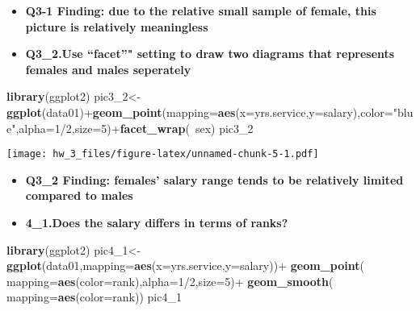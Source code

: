 \documentclass[]{article}
\newenvironment{Shaded}{\begin{snugshade}}{\end{snugshade}}
\newcommand{\KeywordTok}[1]{\textcolor[rgb]{0.13,0.29,0.53}{\textbf{{#1}}}}
\newcommand{\DataTypeTok}[1]{\textcolor[rgb]{0.13,0.29,0.53}{{#1}}}
\newcommand{\DecValTok}[1]{\textcolor[rgb]{0.00,0.00,0.81}{{#1}}}
\newcommand{\StringTok}[1]{\textcolor[rgb]{0.31,0.60,0.02}{{#1}}}
\newcommand{\NormalTok}[1]{{#1}}
\begin{document}
\begin{itemize}
\item
  \textbf{Q3-1 Finding: due to the relative small sample of female, this
  picture is relatively meaningless}
\item
  \textbf{Q3\_2.Use ``facet''" setting to draw two diagrams that
  represents females and males seperately}
\end{itemize}

\begin{Shaded}
\begin{Highlighting}[]
\KeywordTok{library}\NormalTok{(ggplot2)}
\NormalTok{pic3_2<-}\KeywordTok{ggplot}\NormalTok{(data01)+}\KeywordTok{geom_point}\NormalTok{(}\DataTypeTok{mapping=}\KeywordTok{aes}\NormalTok{(}\DataTypeTok{x=}\NormalTok{yrs.service,}\DataTypeTok{y=}\NormalTok{salary),}\DataTypeTok{color=}\StringTok{"blue"}\NormalTok{,}\DataTypeTok{alpha=}\DecValTok{1}\NormalTok{/}\DecValTok{2}\NormalTok{,}\DataTypeTok{size=}\DecValTok{5}\NormalTok{)+}\KeywordTok{facet_wrap}\NormalTok{(~sex)}
\NormalTok{pic3_2}
\end{Highlighting}
\end{Shaded}

\texttt{[image: hw\_3\_files/figure-latex/unnamed-chunk-5-1.pdf]}

\begin{itemize}
\item
  \textbf{Q3\_2 Finding: females' salary range tends to be relatively
  limited compared to males}
\item
  \textbf{4\_1.Does the salary differs in terms of ranks?}
\end{itemize}

\begin{Shaded}
\begin{Highlighting}[]
\KeywordTok{library}\NormalTok{(ggplot2)}
\NormalTok{pic4_1<-}\KeywordTok{ggplot}\NormalTok{(data01,}\DataTypeTok{mapping=}\KeywordTok{aes}\NormalTok{(}\DataTypeTok{x=}\NormalTok{yrs.service,}\DataTypeTok{y=}\NormalTok{salary))+}
\StringTok{  }\KeywordTok{geom_point}\NormalTok{(}
      \DataTypeTok{mapping=}\KeywordTok{aes}\NormalTok{(}\DataTypeTok{color=}\NormalTok{rank),}\DataTypeTok{alpha=}\DecValTok{1}\NormalTok{/}\DecValTok{2}\NormalTok{,}\DataTypeTok{size=}\DecValTok{5}\NormalTok{)+}
\StringTok{  }\KeywordTok{geom_smooth}\NormalTok{(}
      \DataTypeTok{mapping=}\KeywordTok{aes}\NormalTok{(}\DataTypeTok{color=}\NormalTok{rank))}
\NormalTok{pic4_1}
\end{Highlighting}
\end{Shaded}
\end{document}

